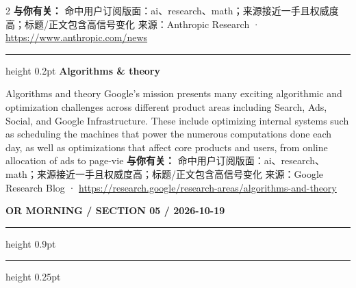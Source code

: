\documentclass[10.5pt]{ctexart}
\begin{document}
\begin{multicols}{2}
\textbf{与你有关：} 命中用户订阅版面：ai、research、math；来源接近一手且权威度高；标题/正文包含高信号变化
{\footnotesize\color{ormuted} 来源：Anthropic Research · \url{https://www.anthropic.com/news}}
\vspace{2mm}
\hrule height 0.2pt
\vspace{2mm}
{\large\bfseries Algorithms \& theory}\par
Algorithms and theory Google’s mission presents many exciting algorithmic and optimization challenges across different product areas including Search, Ads, Social, and Google Infrastructure. These include optimizing internal systems such as scheduling the machines that power the numerous computations done each day, as well as optimizations that affect core products and users, from online allocation of ads to page-vie
\textbf{与你有关：} 命中用户订阅版面：ai、research、math；来源接近一手且权威度高；标题/正文包含高信号变化
{\footnotesize\color{ormuted} 来源：Google Research Blog · \url{https://research.google/research-areas/algorithms-and-theory}}
\end{multicols}
\newpage
{\small\bfseries OR MORNING / SECTION 05 / 2026-10-19}
\vspace{2mm}
\hrule height 0.9pt
\vspace{1.5mm}
\hrule height 0.25pt
\vspace{4mm}
\end{document}
